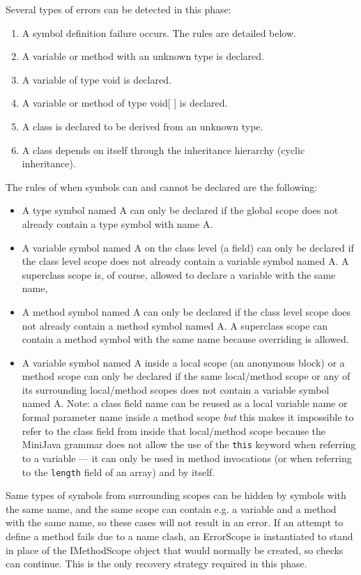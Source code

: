 \documentclass[a4paper,11pt]{article}
\begin{document}
Several types of errors can be detected in this phase:
\begin{enumerate}
    \item A symbol definition failure occurs. The rules are detailed below.
    \item A variable or method with an unknown type is declared.
    \item A variable of type void is declared.
    \item A variable or method of type void[ ] is declared.
    \item A class is declared to be derived from an unknown type.
    \item A class depends on itself through the inheritance hierarchy (cyclic inheritance).
\end{enumerate}

The rules of when symbols can and cannot be declared are the following:
\begin{itemize}
    \item A type symbol named A can only be declared if the global scope does not already contain a type symbol with name A.
    \item A variable symbol named A on the class level (a field) can only be declared if the class level scope does not already contain a variable symbol named A. A superclass scope is, of course, allowed to declare a variable with the same name, 
    \item A method symbol named A can only be declared if the class level scope does not already contain a method symbol named A. A superclass scope can contain a method symbol with the same name because overriding is allowed.
    \item A variable symbol named A inside a local scope (an anonymous block) or a method scope can only be declared if the same local/method scope or any of its surrounding local/method scopes does not contain a variable symbol named A. Note: a class field name can be reused as a local variable name or formal parameter name inside a method scope \emph{but} this makes it impossible to refer to the class field from inside that local/method scope because the MiniJava grammar does not allow the use of the \verb,this, keyword when referring to a variable --- it can only be used in method invocations (or when referring to the \verb,length, field of an array) and by itself.
\end{itemize}

Same types of symbols from surrounding scopes can be hidden by symbols with the same name, and the same scope can contain e.g. a variable and a method with the same name, so these cases will not result in an error. If an attempt to define a method fails due to a name clash, an ErrorScope is instantiated to stand in place of the IMethodScope object that would normally be created, so checks can continue. This is the only recovery strategy required in this phase.
\end{document}
